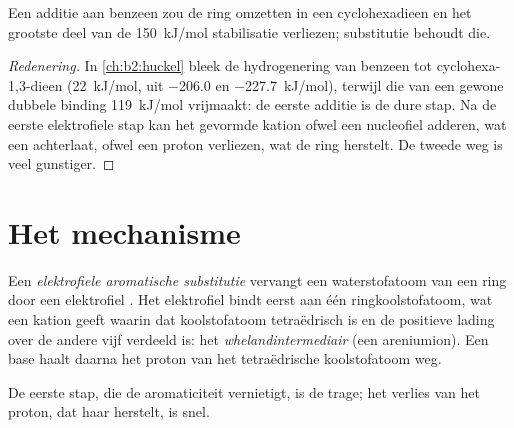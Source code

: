 \begin{proposition}\label{prop:b2:aromatic-substitution:no-addition}
Een additie aan benzeen zou de  ring omzetten in een  cyclohexadieen en
het grootste deel van de \qty{150}{kJ/mol}  stabilisatie verliezen; substitutie behoudt die.
\end{proposition}

\begin{proof}[Redenering]
In \cref{ch:b2:huckel} bleek de hydrogenering van benzeen tot cyclohexa-1,3-dieen
 (\qty{+22}{kJ/mol}, uit \qty{-206.0}{} en \qty{-227.7}{kJ/mol}), terwijl die van een
gewone dubbele binding \qty{119}{kJ/mol} vrijmaakt: de eerste additie is de dure stap.
Na de eerste elektrofiele stap kan het gevormde kation ofwel een nucleofiel adderen, wat
een   achterlaat, ofwel een proton verliezen, wat de  ring herstelt. De tweede
weg is veel gunstiger.
\end{proof}

\section{Het mechanisme}

\begin{definition}\label{def:b2:aromatic-substitution:seAr}
Een \emph{elektrofiele aromatische substitutie}
vervangt een waterstofatoom van een  ring door een elektrofiel . Het elektrofiel
bindt eerst aan één ringkoolstofatoom, wat een kation geeft waarin dat koolstofatoom tetraëdrisch is en de
positieve lading over de andere vijf verdeeld is: het \emph{whelandintermediair}
(een areniumion). Een base haalt daarna het proton van het tetraëdrische koolstofatoom weg.
\end{definition}

\begin{proposition}\label{prop:b2:aromatic-substitution:mechanism}
De eerste stap, die de aromaticiteit vernietigt, is de trage; het verlies van het proton,
dat haar herstelt, is snel.
\end{proposition}

